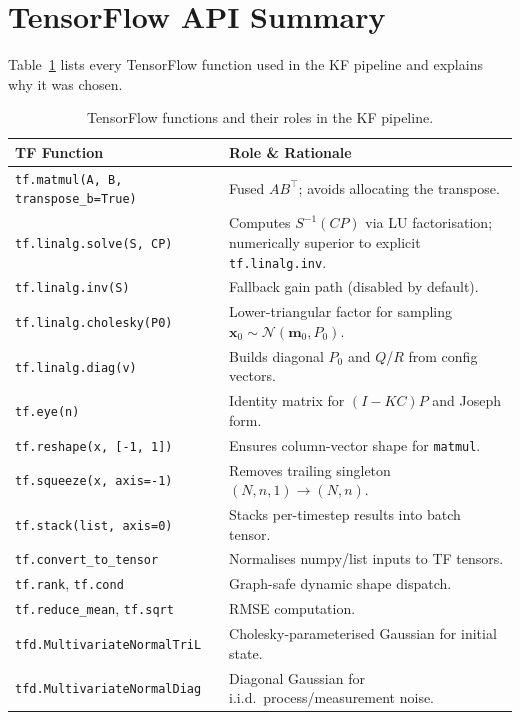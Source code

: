 \documentclass[11pt,a4paper]{article}
\newcommand{\py}[1]{\lstinline[style=py]{#1}}
\begin{document}
\section{TensorFlow API Summary}

Table~\ref{tab:tf} lists every TensorFlow function used in the KF
pipeline and explains why it was chosen.

\begin{table}[h]
\centering
\small
\begin{tabular}{@{}p{4.8cm}p{8.2cm}@{}}
\toprule
\textbf{TF Function} & \textbf{Role \& Rationale} \\
\midrule
\py{tf.matmul(A, B, transpose_b=True)}
  & Fused $AB^\top$; avoids allocating the transpose. \\
\py{tf.linalg.solve(S, CP)}
  & Computes $S^{-1}(CP)$ via LU factorisation;
    numerically superior to explicit \py{tf.linalg.inv}. \\
\py{tf.linalg.inv(S)}
  & Fallback gain path (disabled by default). \\
\py{tf.linalg.cholesky(P0)}
  & Lower-triangular factor for sampling
    $\bm{x}_0 \sim \mathcal{N}(\bm{m}_0, P_0)$. \\
\py{tf.linalg.diag(v)}
  & Builds diagonal $P_0$ and $Q$/$R$ from config vectors. \\
\py{tf.eye(n)}
  & Identity matrix for $(I - KC)P$ and Joseph form. \\
\py{tf.reshape(x, [-1, 1])}
  & Ensures column-vector shape for \py{matmul}. \\
\py{tf.squeeze(x, axis=-1)}
  & Removes trailing singleton $(N,n,1) \to (N,n)$. \\
\py{tf.stack(list, axis=0)}
  & Stacks per-timestep results into batch tensor. \\
\py{tf.convert_to_tensor}
  & Normalises numpy/list inputs to TF tensors. \\
\py{tf.rank}, \py{tf.cond}
  & Graph-safe dynamic shape dispatch. \\
\py{tf.reduce_mean}, \py{tf.sqrt}
  & RMSE computation. \\
\py{tfd.MultivariateNormalTriL}
  & Cholesky-parameterised Gaussian for initial state. \\
\py{tfd.MultivariateNormalDiag}
  & Diagonal Gaussian for i.i.d.\ process/measurement noise. \\
\bottomrule
\end{tabular}
\caption{TensorFlow functions and their roles in the KF pipeline.}
\label{tab:tf}
\end{table}
\end{document}
